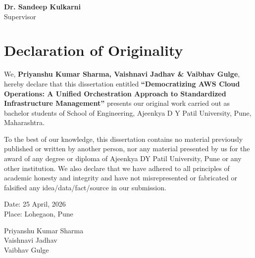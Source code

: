\vspace{4cm}

\begin{flushright}
\textbf{Dr. Sandeep Kulkarni}\\
Supervisor
\end{flushright}

\newpage

\chapter*{Declaration of Originality}

We, \textbf{Priyanshu Kumar Sharma, Vaishnavi Jadhav \& Vaibhav Gulge}, hereby declare that this dissertation entitled \textbf{``Democratizing AWS Cloud Operations: A Unified Orchestration Approach to Standardized Infrastructure Management''} presents our original work carried out as bachelor students of School of Engineering, Ajeenkya D Y Patil University, Pune, Maharashtra.

To the best of our knowledge, this dissertation contains no material previously published or written by another person, nor any material presented by us for the award of any degree or diploma of Ajeenkya DY Patil University, Pune or any other institution. We also declare that we have adhered to all principles of academic honesty and integrity and have not misrepresented or fabricated or falsified any idea/data/fact/source in our submission.

\vspace{2cm}

\begin{flushleft}
Date: 25 April, 2026 \\
Place: Lohegaon, Pune
\end{flushleft}

\vspace{2cm}

\begin{flushright}
Priyanshu Kumar Sharma \\ Vaishnavi Jadhav \\ Vaibhav Gulge
\end{flushright}

\newpage
\fancyhead[C]{} %
\fancyhead[R]{} %

